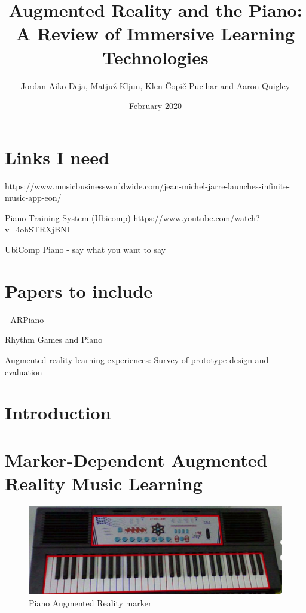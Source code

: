\documentclass{article}
\title{Augmented Reality and the Piano: A Review of Immersive Learning Technologies}
\author{Jordan Aiko Deja, Matjuž Kljun, Klen Čopič Pucihar and Aaron Quigley}
\date{February 2020}
\begin{document}
\maketitle

\section{Links I need}

https://www.musicbusinessworldwide.com/jean-michel-jarre-launches-infinite-music-app-eon/

Piano Training System (Ubicomp)
https://www.youtube.com/watch?v=4ohSTRXjBNI




UbiComp Piano - say what you want to say 
\cite{Weing:2013:PEI:2494091.2494113}


\section{Papers to include}



\cite{ARPiano-2018} - ARPiano 

Rhythm Games and Piano 

Augmented reality learning experiences: Survey of prototype design and evaluation

\section{Introduction}

\section{Marker-Dependent Augmented Reality Music Learning}

\begin{figure}
    \centering
    \includegraphics[width=15cm]{figures/pianomarker.png}
    \caption{Piano Augmented Reality marker}
    \label{fig:pianomarker}
\end{figure}
\end{document}
